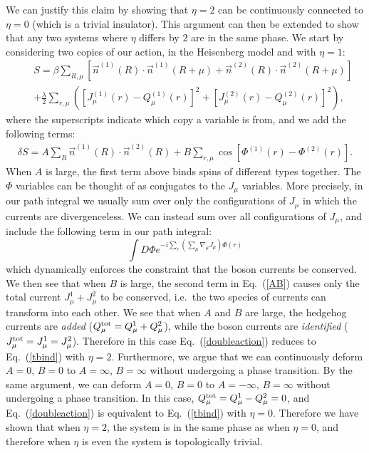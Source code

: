\documentclass[prb,twocolumn]{revtex4-1}
\begin{document}
We can justify this claim by showing that $\eta=2$ can be continuously connected to $\eta=0$ (which is a trivial insulator). This argument can then be extended to show that any two systems where $\eta$ differs by $2$ are in the same phase.
We start by considering two copies of our action, in the Heisenberg model and with $\eta=1$:
\begin{eqnarray}
&&S=\beta\sum_{R,\mu}\left[ \vec{n}^{(1)}(R)\cdot \vec{n}^{(1)}(R+\mu)+\vec{n}^{(2)}(R)\cdot \vec{n}^{(2)}(R+\mu)\right]\nonumber\\
&&+\frac{\lambda}{2}\sum_{r,\mu}\left( [ J_\mu^{(1)}(r)- Q_\mu^{(1)}(r)]^2+[ J_\mu^{(2)}(r)- Q_\mu^{(2)}(r)]^2\right),
\label{doubleaction}
\end{eqnarray}
where the superscripts indicate which copy a variable is from, and we add the following terms:
\begin{eqnarray}
\delta S=A\sum_{R} \vec{n}^{(1)}(R)\cdot \vec{n}^{(2)}(R)+B\sum_{r,\mu} \cos[\Phi^{(1)}(r)-\Phi^{(2)}(r)].
\label{AB}
\end{eqnarray} 
When $A$ is large, the first term above binds spins of different types together. The $\Phi$ variables can be thought of as conjugates to the $J_\mu$ variables. More precisely, in our path integral we usually sum over only the configurations of $J_\mu$ in which the currents are divergenceless. We can instead sum over all configurations of $J_\mu$, and include the following term in our path integral:
\begin{equation}
\int D\Phi e^{-i\sum_r (\sum_\mu\nabla_\mu J_\mu)\Phi(r)}
\end{equation}
which dynamically enforces the constraint that the boson currents be conserved. We then see that when $B$ is large, the second term in Eq.~(\ref{AB}) causes only the total current $J_\mu^1+J_\mu^2$ to be conserved, i.e.~the two species of currents can transform into each other. We see that when $A$ and $B$ are large, the hedgehog currents are \emph{added} ($Q^{\rm tot}_\mu=Q_\mu^1+Q_\mu^2$), while the boson currents are \emph{identified} ($J^{\rm tot}_\mu=J^1_\mu=J^2_\mu$). Therefore in this case Eq.~(\ref{doubleaction}) reduces to Eq.~(\ref{tbind}) with $\eta=2$. Furthermore, we argue that we can continuously deform $A=0$, $B=0$ to $A=\infty$, $B=\infty$ without undergoing a phase transition. By the same argument, we can deform $A=0$, $B=0$ to $A=-\infty$, $B=\infty$ without undergoing a phase transition. In this case, $Q^{\rm tot}_\mu=Q_\mu^1-Q_\mu^2=0$, and Eq.~(\ref{doubleaction}) is equivalent to Eq.~(\ref{tbind}) with $\eta=0$. Therefore we have shown that when $\eta=2$, the system is in the same phase as when $\eta=0$, and therefore when $\eta$ is even the system is topologically trivial.
\end{document}
